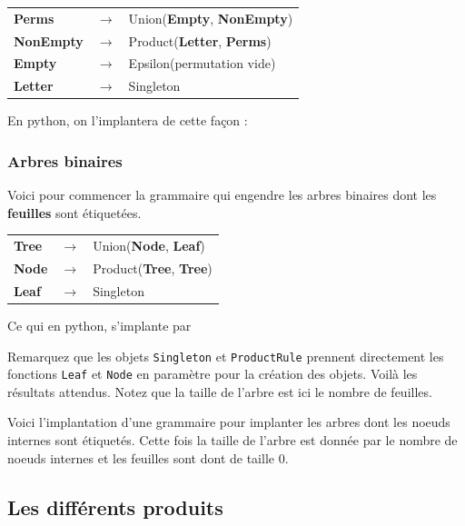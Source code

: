 \documentclass[11pt]{article}
\begin{document}
\begin{tabular}{lll}
\textbf{Perms} & $\rightarrow$ & Union(\textbf{Empty}, \textbf{NonEmpty}) \\
\textbf{NonEmpty} & $\rightarrow$ & Product(\textbf{Letter}, \textbf{Perms}) \\
\textbf{Empty} & $\rightarrow$ & Epsilon(permutation vide) \\
\textbf{Letter} & $\rightarrow$ & Singleton
\end{tabular}

En python, on l'implantera de cette façon :



\subsubsection{Arbres binaires}

Voici pour commencer la grammaire qui engendre les arbres binaires
dont les \textbf{feuilles} sont étiquetées.

\begin{tabular}{lll}
\textbf{Tree} & $\rightarrow$ & Union(\textbf{Node}, \textbf{Leaf}) \\
\textbf{Node} & $\rightarrow$ & Product(\textbf{Tree}, \textbf{Tree}) \\
\textbf{Leaf} & $\rightarrow$ & Singleton
\end{tabular}

Ce qui en python, s'implante par



Remarquez que les objets {\tt Singleton} et {\tt ProductRule} prennent 
directement les fonctions {\tt Leaf} et {\tt Node} en paramètre pour
la création des objets. Voilà les résultats attendus. Notez que
la taille de l'arbre est ici le nombre de feuilles.



Voici l'implantation  d'une grammaire pour implanter les arbres dont les noeuds internes 
sont étiquetés. Cette fois la taille de l'arbre est donnée par le nombre
de noeuds internes et les feuilles sont dont de taille 0.




\subsection{Les différents produits}
\label{seq:product}
\end{document}
